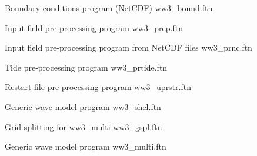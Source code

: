 \noindent
Boundary conditions program (NetCDF) \hfill {\file ww3\_bound.ftn}

\begin{flisti}
\end{flisti}

\noindent
Input field pre-processing program \hfill {\file ww3\_prep.ftn}

\noindent
Input field pre-processing program from NetCDF files \hfill {\file ww3\_prnc.ftn}

\begin{flisti}
\end{flisti}

\noindent
Tide pre-processing program \hfill {\file ww3\_prtide.ftn}

\begin{flisti}
\end{flisti}

\noindent
Restart file pre-processing program \hfill {\file ww3\_uprstr.ftn}

\begin{flisti}
\end{flisti}

\noindent
Generic wave model program \hfill {\file ww3\_shel.ftn}

\begin{flisti}
\end{flisti}


% 

\noindent
Grid splitting for {\file ww3\_multi} \hfill {\file ww3\_gspl.ftn}

\begin{flisti}
\end{flisti}

\noindent
Generic wave model program \hfill {\file ww3\_multi.ftn}

\begin{flisti}
\end{flisti}

